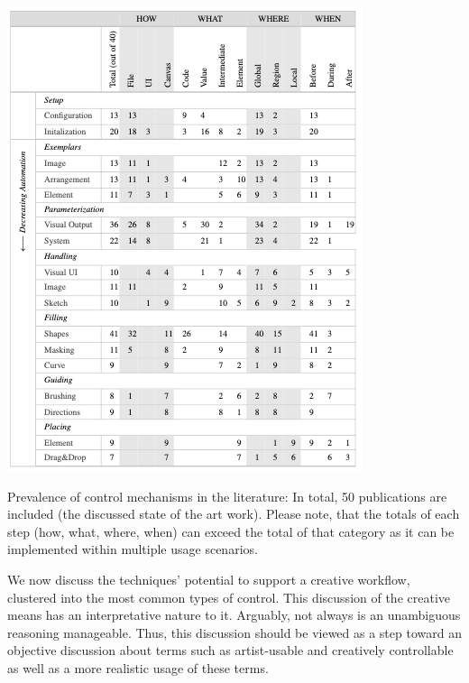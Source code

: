 \begin{table}
    \centering
    \includegraphics[width=\linewidth]{tables/table_controlmechanism.png}
    \caption[Prevalence of control mechanisms]{Prevalence of control mechanisms in the literature: In total, 50 publications are included (the discussed state of the art work). Please note, that the totals of each step (how, what, where, when) can exceed the total of that category as it can be implemented within multiple usage scenarios.\label{table:taxo_controlmechanism}}
\end{table}

We now discuss the techniques' potential to support a creative workflow, clustered into the most common types of control. This discussion of the creative means has an interpretative nature to it. Arguably, not always is an unambiguous reasoning manageable. Thus, this discussion should be viewed as a step toward an objective discussion about terms such as artist-usable and creatively controllable as well as a more realistic usage of these terms.

